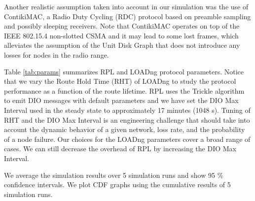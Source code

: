 \documentclass[conference,10pt,a4paper]{IEEEtran}
\begin{document}
Another realistic assumption taken into account in our simulation was the use of
ContikiMAC, a Radio Duty Cycling (RDC) protocol \cite{contikimac} based on
preamble sampling and possibly sleeping receivers. 
Note that ContikiMAC operates on top of the IEEE 802.15.4 non-slotted CSMA and
it may lead to some lost frames, which alleviates the assumption of the Unit
Disk Graph that does not introduce any losses for nodes in the radio range.



\begin{table}[htbp]
\caption{Protocol parameters.\label{tab:params}
}
\label{tab:params.}
\end{table}

Table \ref{tab:params} summarizes RPL and LOADng protocol parameters. Notice
that we vary the Route Hold Time (RHT) of LOADng to study the protocol
performance as a function of the route lifetime. 
RPL uses the
Trickle algorithm \cite{trickle-rfc} to emit DIO messages with default
parameters and we have set the DIO Max
Interval used in the steady state to approximately 17
minutes (1048 s). 
Tuning of RHT  and the DIO Max Interval is an engineering
challenge that should take into account the dynamic behavior of a given network,
loss rate, and the probability of a node failure. 
Our choices for the LOADng parameters cover a broad range of cases. 
We can still decrease the overhead of RPL by increasing the DIO Max Interval.


We average the simulation results over 5 simulation runs and show 95
\% confidence intervals. We plot CDF graphs using the cumulative results of 5
simulation runs. 
\end{document}
